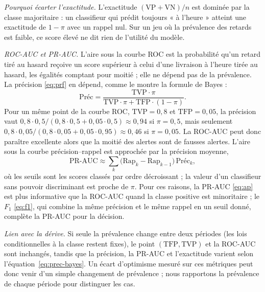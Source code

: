 \documentclass[11pt,a4paper]{article}
\newcommand{\Preci}{\text{Préc}}
\newcommand{\Rapp}{\mathrm{Rap}}
\theoremstyle{definition}
\begin{document}
\emph{Pourquoi écarter l'exactitude.} L'exactitude $(\mathrm{VP}+\mathrm{VN})/n$ est dominée par la classe majoritaire : un classifieur qui prédit toujours « à l'heure » atteint une exactitude de $1-\pi$ avec un rappel nul. Sur un jeu où la prévalence des retards est faible, ce score élevé ne dit rien de l'utilité du modèle.

\emph{ROC-AUC et PR-AUC.} L'aire sous la courbe ROC est la probabilité qu'un retard tiré au hasard reçoive un score supérieur à celui d'une livraison à l'heure tirée au hasard, les égalités comptant pour moitié ; elle ne dépend pas de la prévalence. La précision \eqref{eq:prf} en dépend, comme le montre la formule de Bayes :
\begin{equation}
  \Preci = \frac{\mathrm{TVP}\cdot\pi}{\mathrm{TVP}\cdot\pi + \mathrm{TFP}\cdot(1-\pi)}.
  \label{eq:prec-bayes}
\end{equation}
Pour un même point de la courbe ROC, $\mathrm{TVP}=0{,}8$ et $\mathrm{TFP}=0{,}05$, la précision vaut $0{,}8\cdot0{,}5/(0{,}8\cdot0{,}5+0{,}05\cdot0{,}5)\approx0{,}94$ si $\pi=0{,}5$, mais seulement $0{,}8\cdot0{,}05/(0{,}8\cdot0{,}05+0{,}05\cdot0{,}95)\approx0{,}46$ si $\pi=0{,}05$. La ROC-AUC peut donc paraître excellente alors que la moitié des alertes sont de fausses alertes. L'aire sous la courbe précision--rappel est approchée par la précision moyenne,
\begin{equation}
  \mathrm{PR\text{-}AUC} \approx \sum_{k} \bigl(\Rapp_k - \Rapp_{k-1}\bigr)\,\Preci_k,
  \label{eq:ap}
\end{equation}
où les seuils sont les scores classés par ordre décroissant ; la valeur d'un classifieur sans pouvoir discriminant est proche de $\pi$. Pour ces raisons, la PR-AUC \eqref{eq:ap} est plus informative que la ROC-AUC quand la classe positive est minoritaire \cite{saito2015precision} ; le $F_1$ \eqref{eq:f1}, qui combine la même précision et le même rappel en un seuil donné, complète la PR-AUC pour la décision.

\emph{Lien avec la dérive.} Si seule la prévalence change entre deux périodes (les lois conditionnelles à la classe restent fixes), le point $(\mathrm{TFP},\mathrm{TVP})$ et la ROC-AUC sont inchangés, tandis que la précision, la PR-AUC et l'exactitude varient selon l'équation~\eqref{eq:prec-bayes}. Un écart d'optimisme mesuré sur ces métriques peut donc venir d'un simple changement de prévalence ; nous rapportons la prévalence de chaque période pour distinguer les cas.
\end{document}
